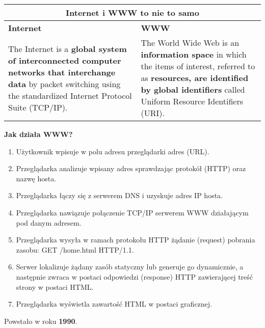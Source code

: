 \documentclass[../main.tex]{subfiles}
\begin{document}
    \begin{table}[H]
        \begin{center}
            \begin{tabular}{|p{8cm}|p{8cm}|}
                \hline
                \multicolumn{2}{|c|}{\textbf{Internet i WWW to nie to samo}}\\
                \hline
                \textbf{Internet} & \textbf{WWW}\\
                \hline
                \hline
                The Internet is a \textbf{global system of interconnected computer networks that interchange data} by
                packet switching using the standardized Internet Protocol Suite (TCP/IP).
                &
                The World Wide Web is an \textbf{information space} in which the items of interest,
                referred to as \textbf{resources, are identified by global identifiers} called Uniform Resource
                Identifiers (URI).\\
                \hline
            \end{tabular}
        \end{center}
    \end{table}

    \textbf{Jak działa WWW?}
    \begin{enumerate}
        \item Użytkownik wpisuje w polu adresu przeglądarki adres (URL).
        \item Przeglądarka analizuje wpisany adres sprawdzając protokół (HTTP) oraz nazwę hosta.
        \item Przeglądarka łączy się z serwerem DNS i uzyskuje adres IP hosta.
        \item Przeglądarka nawiązuje połączenie TCP/IP serwerem WWW działającym pod danym adresem.
        \item Przeglądarka wysyła w ramach protokołu HTTP żądanie (request) pobrania zasobu: GET /home.html HTTP/1.1.
        \item Serwer lokalizuje żądany zasób statyczny lub generuje go dynamicznie, a następnie zwraca w postaci odpowiedzi (response) HTTP zawierającej treść strony w postaci HTML.
        \item Przeglądarka wyświetla zawartość HTML w postaci graficznej.
    \end{enumerate}

    Powstało w roku \textbf{1990}.
\end{document}
